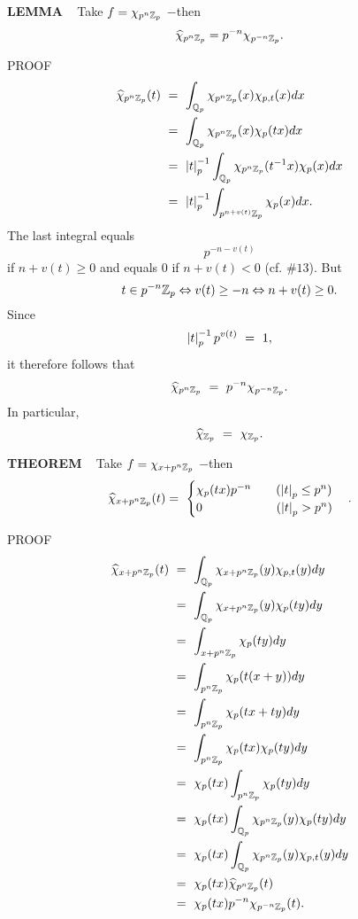 \vspace{0.1cm}


\begin{x}{\small\bf LEMMA} \ %
Take $f = \chi_{p^n\mathbb{Z}_p}$  $-$then
\[
\widehat{\chi}_{p^n\mathbb{Z}_p} = p^{-n} \chi_{p^{-n}\mathbb{Z}_p}.
\]

\vspace{0.1cm}

PROOF \ 
\begin{align*}
\widehat{\chi}_{p^n\mathbb{Z}_p}(t) \ 	
&=\  \int_{\mathbb{Q}_p} \chi_{p^n\mathbb{Z}_p}(x) \chi_{p,t}(x) dx\\
&=\  \int_{\mathbb{Q}_p} \chi_{p^n\mathbb{Z}_p}(x) \chi_p(tx) dx\\
&=\  \left\vert t\right\vert_p^{-1}\int_{\mathbb{Q}_p} \chi_{p^n\mathbb{Z}_p}(t^{-1}x) \chi_p(x) dx\\
&=\  \left\vert t\right\vert_p^{-1}\int_{p^{n+v(t)}\mathbb{Z}_p} \chi_p(x) dx.
\end{align*}
The last integral equals 
\[
p^{-n - v(t)}
\]
if $n + v(t) \geq 0$ and equals 0 if $n + v(t) < 0$ (cf. $\# 13$).  
But
\[
t \in p^{-n}\mathbb{Z}_p \Leftrightarrow v(t) \ge -n \Leftrightarrow n+v(t) \ge 0.
\]
Since
\[
\left\vert t\right\vert^{-1}_pp^{v(t)} \ =\  1,
\]
it therefore follows that
\[
\widehat{\chi}_{p^n\mathbb{Z}_p} \ =\  p^{-n} \chi_{p^{-n}\mathbb{Z}_p}.
\]
In particular, 
\[
\widehat{\chi}_{\Z_p} \ =\  \chi_{\Z_p}.
\]
\end{x}

\vspace{0.1cm}

\begin{x}{\small\bf THEOREM} \ %
Take $f = \chi_{x+p^n\mathbb{Z}_p}$ $-$then
\[
\widehat{\chi}_{x+p^n\Z_p}(t)  = \ 
\begin{cases}
\chi_p(tx)p^{-n} \qquad (\abs{t}_p \le p^n)\\
0 \qquad \qquad\qquad (\abs{t}_p > p^n)
\end{cases}
.
\]

\vspace{0.1cm}

PROOF \ 
\begin{align*}
\widehat{\chi}_{x+p^n\Z_p}(t) \ 
&=\  \int_{\Q_p} \chi_{x+p^n\Z_p}(y) \chi_{p,t}(y) dy\\
&=\  \int_{\Q_p} \chi_{x+p^n\Z_p}(y) \chi_p(ty) dy\\
&=\  \int_{x+p^n\Z_p} \chi_p(ty) dy\\
&=\  \int_{p^n\Z_p} \chi_p(t(x+y)) dy\\
&=\  \int_{p^n\Z_p} \chi_p(tx+ty) dy\\
&=\  \int_{p^n\Z_p} \chi_p(tx) \chi_p(ty) dy\\
&=\  \chi_p(tx) \int_{p^n\Z_p} \chi_p(ty) dy\\
&=\  \chi_p(tx) \int_{\Q_p} \chi_{p^n\Z_p}(y) \chi_p(ty) dy\\										
&=\  \chi_p(tx) \int_{\Q_p} \chi_{p^n\Z_p}(y) \chi_{p,t}(y) dy\\
&=\  \chi_p(tx) \widehat{\chi}_{{p^n}\Z_p} (t)\\
&=\  \chi_p(tx) p^{-n}\chi_{p^{-n}\Z_p}(t).
\end{align*}
\end{x}

